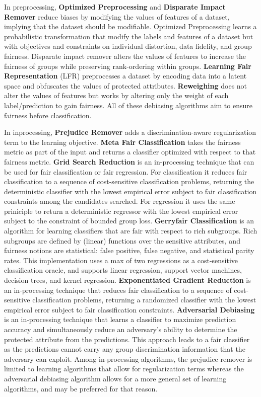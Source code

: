 \documentclass[sigconf,review]{acmart}
\begin{document}
In preprocessing, \textbf{Optimized Preprocessing} \cite{calmon2017optimized} and \textbf{Disparate Impact Remover} \cite{feldman2015disparate} reduce biases by modifying the values of features of a dataset, implying that the dataset should be modifiable. 
Optimized Preprocessing learns a probabilistic transformation that modify the labels and features of a dataset but with objectives and constraints on individual distortion, data fidelity, and group fairness.
Disparate impact remover alters the values of features to increase the fairness of groups while preserving rank-ordering within groups.
\textbf{Learning Fair Representation} (LFR) \cite{zemel2013lfr} preprocesses a dataset by encoding data into a latent space and obfuscates the values of protected attributes.
\textbf{Reweighing} \cite{kamiran2011reweighing} does not alter the values of features but works by altering only the weight of each label/prediction to gain fairness. All of these debiasing algorithms aim to ensure fairness before classification.

In inprocessing, \textbf{Prejudice Remover} \cite{kamishima2012prejudice} adds a discrimination-aware regularization term to the learning objective.
\textbf{Meta Fair Classification} takes the fairness metric as part of the input and returns a classifier optimized with respect to that fairness metric.
\textbf{Grid Search Reduction} is an in-processing technique that can be used for fair classification or fair regression. For classification it reduces fair classification to a sequence of cost-sensitive classification problems, returning the deterministic classifier with the lowest empirical error subject to fair classification constraints among the candidates searched. For regression it uses the same priniciple to return a deterministic regressor with the lowest empirical error subject to the constraint of bounded group loss.
\textbf{Gerryfair Classification} is an algorithm for learning classifiers that are fair with respect to rich subgroups. Rich subgroups are defined by (linear) functions over the sensitive attributes, and fairness notions are statistical: false positive, false negative, and statistical parity rates. This implementation uses a max of two regressions as a cost-sensitive classification oracle, and supports linear regression, support vector machines, decision trees, and kernel regression. 
\textbf{Exponentiated Gradient Reduction} is an in-processing technique that reduces fair classification to a sequence of cost-sensitive classification problems, returning a randomized classifier with the lowest empirical error subject to fair classification constraints.
\textbf{Adversarial Debiasing} is an in-processing technique that learns a classifier to maximize prediction accuracy and simultaneously reduce an adversary's ability to determine the protected attribute from the predictions. This approach leads to a fair classifier as the predictions cannot carry any group discrimination information that the adversary can exploit.
Among in-processing algorithms, the prejudice remover is limited to learning algorithms that allow for regularization terms whereas the adversarial debiasing algorithm allows for a more general set of learning algorithms, and may be preferred for that reason.
\end{document}
